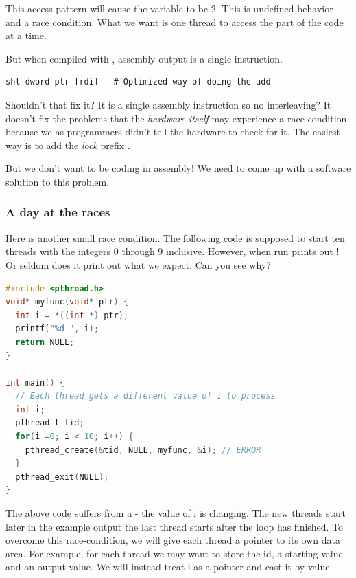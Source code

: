 This access pattern will cause the variable  to be 2.
This is undefined behavior and a race condition.
What we want is one thread to access the part of the code at a time.

But when compiled with , assembly output is a single instruction.

\begin{lstlisting}[language={[x86masm]Assembler}]
shl dword ptr [rdi]   # Optimized way of doing the add
\end{lstlisting}

Shouldn't that fix it? It is a single assembly instruction so no interleaving?
It doesn't fix the problems that the \textit{hardware itself} may experience a race condition because we as programmers didn't tell the hardware to check for it.
The easiest way is to add the \textit{lock} prefix \cite[p. 1120]{guide2011intel}.

But we don't want to be coding in assembly!
We need to come up with a software solution to this problem.

\subsubsection{A day at the races}

Here is another small race condition.
The following code is supposed to start ten threads with the integers 0 through 9 inclusive.
However, when run prints out !
Or seldom does it print out what we expect.
Can you see why?

\begin{lstlisting}[language=C]
#include <pthread.h>
void* myfunc(void* ptr) {
  int i = *((int *) ptr);
  printf("%d ", i);
  return NULL;
}

int main() {
  // Each thread gets a different value of i to process
  int i;
  pthread_t tid;
  for(i =0; i < 10; i++) {
    pthread_create(&tid, NULL, myfunc, &i); // ERROR
  }
  pthread_exit(NULL);
}
\end{lstlisting}

The above code suffers from a  - the value of i is changing.
The new threads start later in the example output the last thread starts after the loop has finished.
To overcome this race-condition, we will give each thread a pointer to its own data area.
For example, for each thread we may want to store the id, a starting value and an output value.
We will instead treat i as a pointer and cast it by value.

